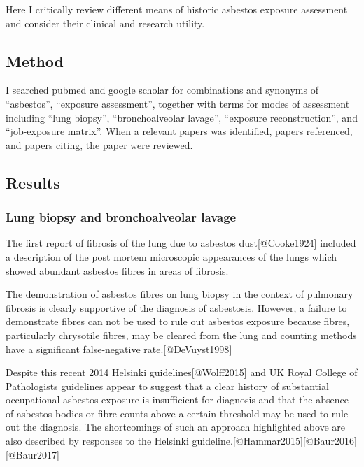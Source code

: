 \documentclass[
]{article}
\begin{document}
Here I critically review different means of historic asbestos exposure
assessment and consider their clinical and research utility.

\hypertarget{method-2}{%
\subsection{Method}\label{method-2}}

I searched pubmed and google scholar for combinations and synonyms of
``asbestos'', ``exposure assessment'', together with terms for modes of
assessment including ``lung biopsy'', ``bronchoalveolar lavage'',
``exposure reconstruction'', and ``job-exposure matrix''. When a
relevant papers was identified, papers referenced, and papers citing,
the paper were reviewed.

\hypertarget{results-2}{%
\subsection{Results}\label{results-2}}

\hypertarget{lung-biopsy-and-bronchoalveolar-lavage}{%
\subsubsection{Lung biopsy and bronchoalveolar
lavage}\label{lung-biopsy-and-bronchoalveolar-lavage}}

The first report of fibrosis of the lung due to asbestos
dust{[}@Cooke1924{]} included a description of the post mortem
microscopic appearances of the lungs which showed abundant asbestos
fibres in areas of fibrosis.

The demonstration of asbestos fibres on lung biopsy in the context of
pulmonary fibrosis is clearly supportive of the diagnosis of asbestosis.
However, a failure to demonstrate fibres can not be used to rule out
asbestos exposure because fibres, particularly chrysotile fibres, may be
cleared from the lung and counting methods have a significant
false-negative rate.{[}@DeVuyst1998{]}

Despite this recent 2014 Helsinki guidelines{[}@Wolff2015{]} and UK
Royal College of Pathologists guidelines appear to suggest that a clear
history of substantial occupational asbestos exposure is insufficient
for diagnosis and that the absence of asbestos bodies or fibre counts
above a certain threshold may be used to rule out the diagnosis. The
shortcomings of such an approach highlighted above are also described by
responses to the Helsinki
guideline.{[}@Hammar2015{]}{[}@Baur2016{]}{[}@Baur2017{]}
\end{document}
